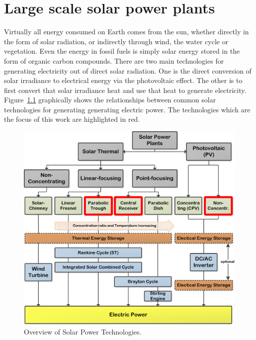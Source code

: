 \chapter{Large scale solar power plants}
Virtually all energy consumed on Earth comes from the sun, whether directly in the form of solar radiation, or indirectly through wind, the water cycle or vegetation. Even the energy in fossil fuels is simply solar energy stored in the form of organic carbon compounds. There are two main technologies for generating electricity out of direct solar radiation. One is the direct conversion of solar irradiance to electrical energy via the photovoltaic effect. The other is to first convert that solar irradiance heat and use that heat to generate electricity. Figure~\ref{OverviewSTP} graphically shows the relationships between common solar technologies for generating generating electric power. The technologies which are the focus of this work are highlighted in red.

\begin{figure}[!h] 
\centering
\includegraphics[width=0.75\linewidth]{FIG/OverviewSTP}
\caption[Overview of Solar Power Technologies.]{Overview of Solar Power Technologies.}\label{OverviewSTP}
\end{figure}


